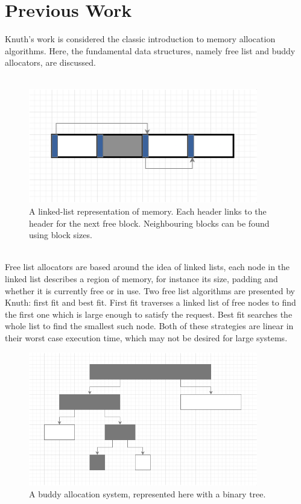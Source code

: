 \documentclass{article}
\begin{document}
\section{Previous Work}
Knuth's work \cite{knuth97} is considered the classic introduction to memory allocation algorithms. Here, the fundamental data structures, namely free list and buddy allocators, are discussed.\\
\\
\begin{figure}[h]
	\centering
	\includegraphics[width=10cm]{list_allocator}
	\captionsetup{width=10cm}
	\caption{A linked-list representation of memory. Each header links to the header for the next free block. Neighbouring blocks can be found using block sizes.}
\end{figure}
\\
Free list allocators are based around the idea of linked lists, each node in the linked list describes a region of memory, for instance its size, padding and whether it is currently free or in use. Two free list algorithms are presented by Knuth: first fit and best fit. First fit traverses a linked list of free nodes to find the first one which is large enough to satisfy the request. Best fit searches the whole list to find the smallest such node. Both of these strategies are linear in their worst case execution time, which may not be desired for large systems.\\
\pagebreak
\begin{figure}[h]
	\centering
	\includegraphics[width=10cm]{buddy_allocator}
	\captionsetup{width=10cm}
	\caption{A buddy allocation system, represented here with a binary tree.}
\end{figure}
\end{document}
